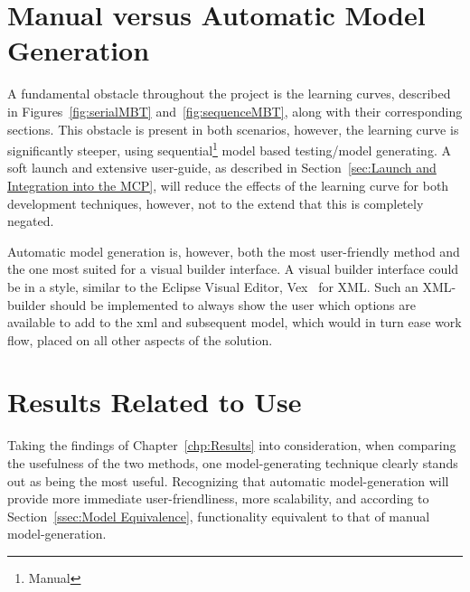 \section{Manual versus Automatic Model Generation}
A fundamental obstacle throughout the project is the learning curves, described in Figures~\ref{fig:serialMBT} and~\ref{fig:sequenceMBT}, along with their corresponding sections. This obstacle is present in both scenarios, however, the learning curve is significantly steeper, using sequential\footnote{Manual} model based testing/model generating. A soft launch and extensive user-guide, as described in Section~\ref{sec:Launch and Integration into the MCP}, will reduce the effects of the learning curve for both development techniques, however, not to the extend that this is completely negated.

Automatic model generation is, however, both the most user-friendly method and the one most suited for a visual builder interface. A visual builder interface could be in a style, similar to the Eclipse Visual Editor, Vex~\cite{vex} for XML. Such an XML-builder should be implemented to always show the user which options are available to add to the xml and subsequent model, which would in turn ease work flow, placed on all other aspects of the solution.

\section{Results Related to Use}
Taking the findings of Chapter~\ref{chp:Results} into consideration, when comparing the usefulness of the two methods, one model-generating technique clearly stands out as being the most useful. Recognizing that automatic model-generation will provide more immediate user-friendliness, more scalability, and according to Section~\ref{ssec:Model Equivalence}, functionality equivalent to that of manual model-generation.

